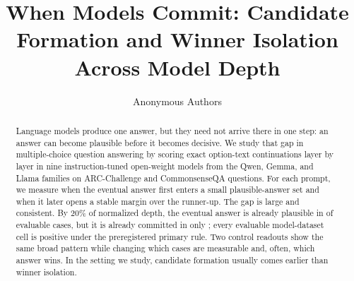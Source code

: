 \documentclass{article}
\title{When Models Commit: Candidate Formation and Winner Isolation Across Model Depth}
\author{Anonymous Authors}
\begin{document}
\ifcolmsubmission
\linenumbers
\fi

\maketitle

\begin{abstract}
Language models produce one answer, but they need not arrive there in one step: an answer can become plausible before it becomes decisive. We study that gap in multiple-choice question answering by scoring exact option-text continuations layer by layer in nine instruction-tuned open-weight models from the Qwen, Gemma, and Llama families on \PaperPromptCount{} ARC-Challenge and CommonsenseQA questions. For each prompt, we measure when the eventual answer first enters a small plausible-answer set and when it later opens a stable margin over the runner-up. The gap is large and consistent. By 20\% of normalized depth, the eventual answer is already plausible in \FlagshipTwentyPlausiblePct{} of evaluable cases, but it is already committed in only \FlagshipTwentyCommittedPct{}; every evaluable model-dataset cell is positive under the preregistered primary rule. Two control readouts show the same broad pattern while changing which cases are measurable and, often, which answer wins. In the setting we study, candidate formation usually comes earlier than winner isolation.
\end{abstract}











\onecolumn
\appendix

\end{document}
